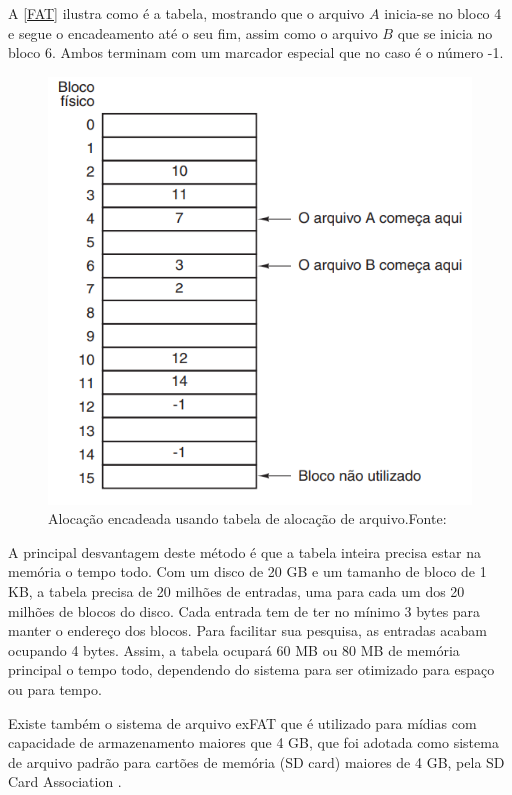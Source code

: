 A \autoref{FAT} ilustra como é a tabela, mostrando que o arquivo $A$ inicia-se no bloco 4 e segue o encadeamento até o seu fim, assim como o arquivo $B$ que se inicia no bloco 6. Ambos terminam com um marcador especial que no caso é o número -1.

\begin{figure}[H]
    \scriptsize
     \centering
     \includegraphics[scale=0.7]{dados/figuras/FAT.png}
     \caption{Alocação encadeada usando tabela de alocação de arquivo.\newline  Fonte:\cite{tanenbaumSO}}
     \label{FAT}
\end{figure}

A principal desvantagem deste método é que a tabela inteira precisa estar na memória o tempo todo. Com um disco de 20 GB e um tamanho de bloco de 1 KB, a tabela precisa de 20 milhões de entradas, uma para cada um dos 20 milhões de blocos do disco. Cada entrada tem de ter no mínimo 3 bytes para manter o endereço dos blocos. Para facilitar sua pesquisa, as entradas acabam ocupando 4 bytes. Assim, a tabela ocupará 60 MB ou 80 MB de memória principal o tempo todo, dependendo do sistema para ser otimizado para espaço ou para tempo.

Existe também o sistema de arquivo exFAT que é utilizado para mídias com capacidade de armazenamento maiores que 4 GB, que foi adotada como sistema de arquivo padrão para cartões de memória (SD card) maiores de 4 GB, pela SD Card Association \cite{SDCARD}.

